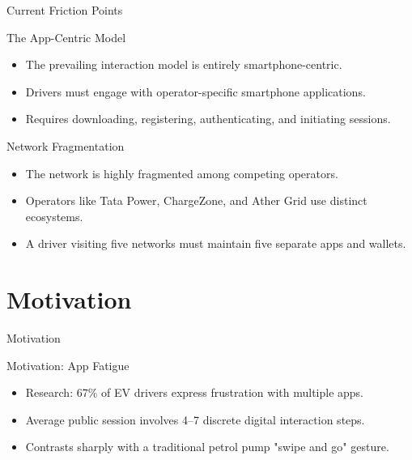 \documentclass{beamer}
\begin{document}
\begin{frame}
    \centering
    \Huge Current Friction Points
\end{frame}

\begin{frame}{The App-Centric Model}
\begin{itemize}
    \item The prevailing interaction model is entirely smartphone-centric.
    \item Drivers must engage with operator-specific smartphone applications.
    \item Requires downloading, registering, authenticating, and initiating sessions.
\end{itemize}
\end{frame}

\begin{frame}{Network Fragmentation}
\begin{itemize}
    \item The network is highly fragmented among competing operators.
    \item Operators like Tata Power, ChargeZone, and Ather Grid use distinct ecosystems.
    \item A driver visiting five networks must maintain five separate apps and wallets.
\end{itemize}
\end{frame}

\section{Motivation}

\begin{frame}
    \centering
    \Huge Motivation
\end{frame}

\begin{frame}{Motivation: App Fatigue}
\begin{itemize}
    \item Research: 67\% of EV drivers express frustration with multiple apps.
    \item Average public session involves 4--7 discrete digital interaction steps.
    \item Contrasts sharply with a traditional petrol pump "swipe and go" gesture.
\end{itemize}
\end{frame}
\end{document}

